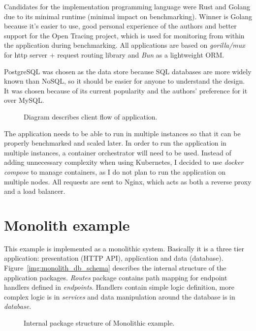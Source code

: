 Candidates for the implementation programming language were Rust and Golang due to its minimal runtime (minimal impact on benchmarking). Winner is Golang because it's easier to use, good personal experience of the authors and better support for the Open Tracing project, which is used for monitoring from within the application during benchmarking. All applications are based on \textit{gorilla/mux} \cite{MUX} for http server + request routing library and \textit{Bun} \cite{BUN} as a lightweight ORM.

PostgreSQL was chosen as the data store because SQL databases are more widely known than NoSQL, so it should be easier for anyone to understand the design. It was chosen because of its current popularity and the authors' preference for it over MySQL.
\begin{figure}
    \centering
    
    \caption{Diagram describes client flow of application. \label{img:app_activity_flow}}
\end{figure}

The application needs to be able to run in multiple instances so that it can be properly benchmarked and scaled later. In order to run the application in multiple instances, a container orchestrator will need to be used. Instead of adding unnecessary complexity when using Kubernetes, I decided to use \textit{docker compose} to manage containers, as I do not plan to run the application on multiple nodes. All requests are sent to Nginx, which acts as both a reverse proxy and a load balancer.


\section{Monolith example}
This example is implemented as a monolithic system. Basically it is a three tier application: presentation (HTTP API), application and data (database). Figure~\ref{img:monolith_db_schema} describes the internal structure of the application packages. \textit{Routes} package contains path mapping for endpoint handlers defined in \textit{endpoints}. Handlers contain simple logic definition, more complex logic is in \textit{services} and data manipulation around the database is in \textit{database}.

\begin{figure}
    \centering
    
    \caption{Internal package structure of Monolithic example. \label{img:monolith_package}}
\end{figure}


